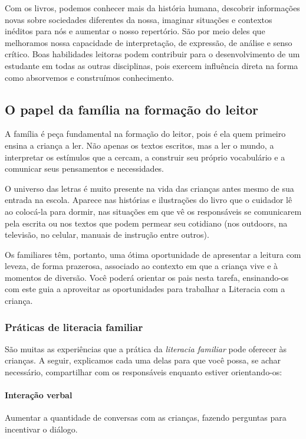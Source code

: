 \documentclass[11pt]{extarticle}
\begin{document}
Com os livros, podemos conhecer mais da história humana, descobrir informações 
novas sobre sociedades diferentes da nossa, imaginar situações e contextos inéditos 
para nós e aumentar o nosso repertório. São por meio deles que melhoramos nossa 
capacidade de interpretação, de expressão, de análise e senso crítico. Boas habilidades 
leitoras podem contribuir para o desenvolvimento de um estudante em todas as outras 
disciplinas, pois exercem influência direta na forma como absorvemos e 
construímos conhecimento.


\subsection{O papel da família na formação do leitor}
A família é peça fundamental na formação do leitor, pois é ela quem primeiro 
ensina a criança a ler. Não apenas os textos escritos, mas a ler o mundo, a 
interpretar os estímulos que a cercam, a construir seu próprio vocabulário e a 
comunicar seus pensamentos e necessidades.

O universo das letras é muito presente na vida das crianças antes mesmo de sua 
entrada na escola. Aparece nas histórias e ilustrações do livro que o cuidador 
lê ao colocá-la para dormir, nas situações em que vê os responsáveis se comunicarem 
pela escrita ou nos textos que podem permear seu cotidiano (nos outdoors, na 
televisão, no celular, manuais de instrução entre outros). 

Os familiares têm, 
portanto, uma ótima oportunidade de apresentar a leitura com leveza, de forma 
prazerosa, associado ao contexto em que a criança vive e à momentos de diversão. 
Você poderá orientar os pais nesta tarefa, ensinando-os com este guia a aproveitar 
as oportunidades para trabalhar a Literacia com a criança.


\subsubsection{Práticas de literacia familiar} 

São muitas as experiências que a prática da \textit{literacia familiar} 
pode oferecer às crianças. A seguir, explicamos cada uma delas para que você possa, 
se achar necessário, compartilhar com os responsáveis enquanto estiver orientando-os: 

\paragraph{Interação verbal} Aumentar a quantidade de conversas com as 
crianças, fazendo perguntas para incentivar o diálogo.
\end{document}
